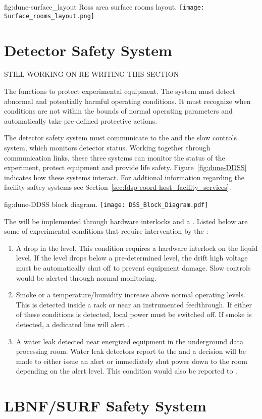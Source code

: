 \begin{dunefigure}{fig:dune-surface_layout}
  {Ross area surface rooms layout.}
  \texttt{[image: Surface\_rooms\_layout.png]}
\end{dunefigure}




\section{ Detector Safety System}
\label{sec:fdsp-coord-det-safety}

STILL WORKING ON RE-WRITING THIS SECTION

The  functions to protect experimental equipment.  The
system must detect abnormal and potentially harmful operating
conditions.  It must recognize when conditions are not within the
bounds of normal operating parameters and automatically take
pre-defined protective actions.


The detector safety system must communicate to the \surf {}
and the  slow controls system, which monitors detector
status.  Working together through communication links, these three
systems can monitor the status of the experiment, protect equipment
and provide life safety. Figure~\ref{fig:dune-DDSS} indicates how
these systems interact. For addtional information regarding the
facility saftey systems see
Section~\ref{sec:fdsp-coord-host_facility_services}.
\begin{dunefigure}{fig:dune-DDSS}
  { block diagram.}
  \texttt{[image: DSS\_Block\_Diagram.pdf]}
\end{dunefigure}


The  will be implemented through hardware interlocks and a
.  Listed below are some of  experimental
conditions that require intervention by the :
\begin{enumerate}
 \item A drop in the  level.  This condition requires a hardware
   interlock on the liquid level.  If the level drops below a
   pre-determined level, the drift high voltage must be automatically 
   shut off to prevent equipment damage.  Slow controls would be
   alerted through normal monitoring.
 \item Smoke or a temperature/humidity increase above normal operating
   levels. This is detected inside a rack or near an instrumented
   feedthrough.  If either of these conditions is detected, local
   power must be switched off. If smoke is detected, a
   dedicated line will alert .
 \item A water leak detected near energized equipment in the 
   underground data processing room.  Water leak detectors 
   report to the   and a decision will be made to either
   issue an alert or immediately shut power down to the room depending
   on the alert level.  This condition would also be reported
   to .
\end{enumerate}



\section{LBNF/SURF Safety System}
\label{sec:fdsp-coord-surf-safety}

